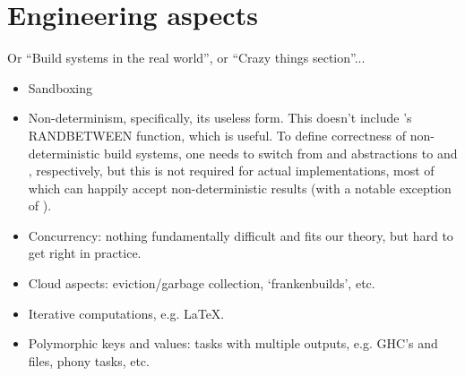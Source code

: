 \clearpage
\section{Engineering aspects}\label{sec-engineering}

Or ``Build systems in the real world'', or ``Crazy things section''...

\begin{itemize}
    \item Sandboxing
    \item Non-determinism, specifically, its useless form. This doesn't
          include \Excel's \textsf{RANDBETWEEN} function, which is useful.
          To define correctness of non-deterministic build systems, one needs to
          switch from  and  abstractions to
           and , respectively, but this is not
          required for actual implementations, most of which can happily accept
          non-deterministic results (with a notable exception of \Buck).
    \item Concurrency: nothing fundamentally difficult and fits our theory, but
          hard to get right in practice.
    \item Cloud aspects: eviction/garbage collection, `frankenbuilds', etc.
    \item Iterative computations, e.g. LaTeX.
    \item Polymorphic keys and values: tasks with multiple outputs, e.g. GHC's
           and  files, phony tasks, etc.
\end{itemize}
